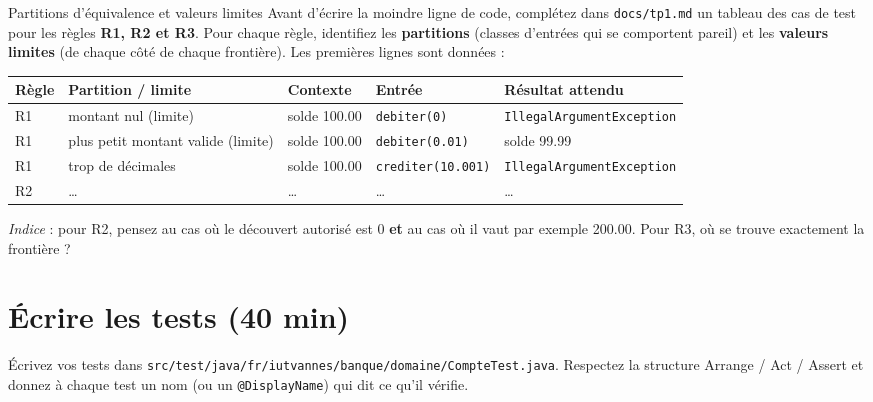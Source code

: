 \documentclass[11pt]{article}
\begin{document}
\begin{exobox}{Partitions d'équivalence et valeurs limites}
Avant d'écrire la moindre ligne de code, complétez dans \texttt{docs/tp1.md} un tableau des cas de test pour les règles \textbf{R1, R2 et R3}. Pour chaque règle, identifiez les \textbf{partitions} (classes d'entrées qui se comportent pareil) et les \textbf{valeurs limites} (de chaque côté de chaque frontière). Les premières lignes sont données :

\medskip
{\footnotesize
\begin{tabular}{@{}lllll@{}}
\toprule
\textbf{Règle} & \textbf{Partition / limite} & \textbf{Contexte} & \textbf{Entrée} & \textbf{Résultat attendu} \\
\midrule
R1 & montant nul (limite) & solde 100.00 & \texttt{debiter(0)} & \texttt{IllegalArgumentException} \\
R1 & plus petit montant valide (limite) & solde 100.00 & \texttt{debiter(0.01)} & solde 99.99 \\
R1 & trop de décimales & solde 100.00 & \texttt{crediter(10.001)} & \texttt{IllegalArgumentException} \\
R2 & \ldots & \ldots & \ldots & \ldots \\
\bottomrule
\end{tabular}}
\medskip

\textit{Indice} : pour R2, pensez au cas où le découvert autorisé est 0 \textbf{et} au cas où il vaut par exemple 200.00. Pour R3, où se trouve exactement la frontière ?
\end{exobox}

\section{Écrire les tests (40 min)}

Écrivez vos tests dans \texttt{src/test/java/fr/iutvannes/banque/domaine/CompteTest.java}. Respectez la structure Arrange / Act / Assert et donnez à chaque test un nom (ou un \texttt{@DisplayName}) qui dit ce qu'il vérifie.
\end{document}

